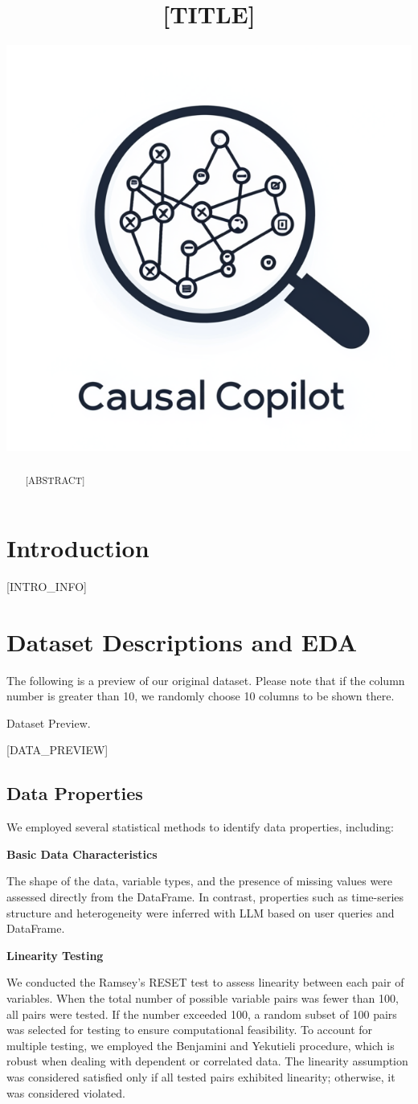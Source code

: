 \documentclass{article}
\title{[TITLE]}
\author{ \href{https://github.com/Lancelot39/Causal-Copilot/tree/main}{\includegraphics[scale=0.06]{asset/logo.png}} }
\begin{document}
\maketitle

\begin{abstract}
[ABSTRACT]
\end{abstract}


\raggedbottom
\section{Introduction}
[INTRO_INFO]

\section{Dataset Descriptions and EDA}
The following is a preview of our original dataset. Please note that if the column number is greater than 10,
we randomly choose 10 columns to be shown there.

\begin{table}[H]
    \centering
    \caption{Dataset Preview.}
    [DATA_PREVIEW]
\end{table}

\subsection{Data Properties}

We employed several statistical methods to identify data properties, including:

\textbf{Basic Data Characteristics}

The shape of the data, variable types, and the presence of missing values were assessed directly from the DataFrame. 
In contrast, properties such as time-series structure and heterogeneity were inferred with LLM based on user queries and DataFrame.

\textbf{Linearity Testing}

We conducted the Ramsey's RESET test to assess linearity between each pair of variables. When the total number of possible variable pairs was fewer than 100, all pairs were tested. If the number exceeded 100, a random subset of 100 pairs was selected for testing to ensure computational feasibility. 
To account for multiple testing, we employed the Benjamini and Yekutieli procedure, which is robust when dealing with dependent or correlated data. 
The linearity assumption was considered satisfied only if all tested pairs exhibited linearity; otherwise, it was considered violated.
\end{document}
